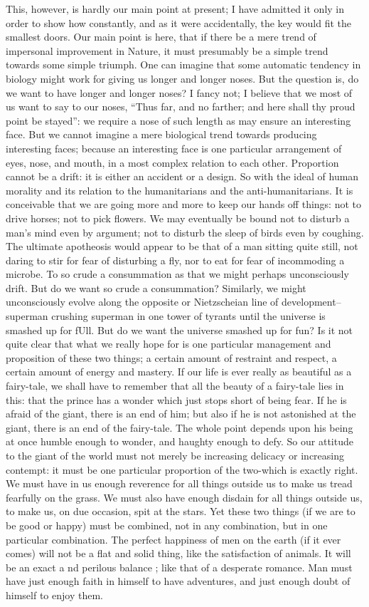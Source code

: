 \documentclass{book}
\begin{document}
This, however, is hardly our main point at present; I have admitted it only in order to show how constantly, and as it were accidentally, the key would fit the smallest doors. Our main point is here, that if there be a mere trend of impersonal improvement in Nature, it must presumably be a simple trend towards some simple triumph. One can imagine that some automatic tendency in biology might work for giving us longer and longer noses. But the question is, do we want to have longer and longer noses? I fancy not; I believe that we most of us want to say to our noses, “Thus far, and no farther; and here shall thy proud point be stayed”: we require a nose of such length as may ensure an interesting face. But we cannot imagine a mere biological trend towards producing interesting faces; because an interesting face is one particular arrangement of eyes, nose, and mouth, in a most complex relation to each other. Proportion cannot be a drift: it is either an accident or a design. So with the ideal of human morality and its relation to the humanitarians and the anti-humanitarians. It is conceivable that we are going more and more to keep our hands off things: not to drive horses; not to pick flowers. We may eventually be bound not to disturb a man’s mind even by argument; not to disturb the sleep of birds even by coughing. The ultimate apotheosis would appear to be that of a man sitting quite still, not daring to stir for fear of disturbing a fly, nor to eat for fear of incommoding a microbe. To so crude a consummation as that we might perhaps unconsciously drift. But do we want so crude a consummation? Similarly, we might unconsciously evolve along the opposite or Nietzscheian line of development–superman crushing superman in one tower of tyrants until the universe is smashed up for fUll. But do we want the universe smashed up for fun? Is it not quite clear that what we really hope for is one particular management and proposition of these two things; a certain amount of restraint and respect, a certain amount of energy and mastery. If our life is ever really as beautiful as a fairy-tale, we shall have to remember that all the beauty of a fairy-tale lies in this: that the prince has a wonder which just stops short of being fear. If he is afraid of the giant, there is an end of him; but also if he is not astonished at the giant, there is an end of the fairy-tale. The whole point depends upon his being at once humble enough to wonder, and haughty enough to defy. So our attitude to the giant of the world must not merely be increasing delicacy or increasing contempt: it must be one particular proportion of the two-which is exactly right. We must have in us enough reverence for all things outside us to make us tread fearfully on the grass. We must also have enough disdain for all things outside us, to make us, on due occasion, spit at the stars. Yet these two things (if we are to be good or happy) must be combined, not in any combination, but in one particular combination. The perfect happiness of men on the earth (if it ever comes) will not be a flat and solid thing, like the satisfaction of animals. It will be an exact a nd perilous balance ; like that of a desperate romance. Man must have just enough faith in himself to have adventures, and just enough doubt of himself to enjoy them.
\end{document}
